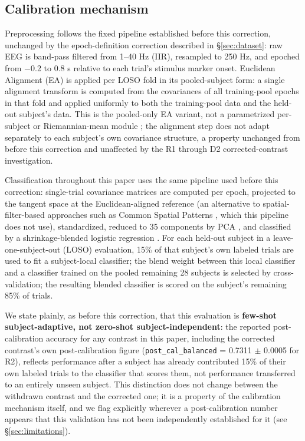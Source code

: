 \documentclass[preprint,12pt]{elsarticle}
\begin{document}
\subsection{Calibration mechanism}\label{sec:calibration}

Preprocessing follows the fixed pipeline established before this correction, unchanged by the epoch-definition correction described in \S\ref{sec:dataset}: raw EEG is band-pass filtered \cite{gramfort2013,delormemakeig2004,jas2017} from 1--40 Hz (IIR), resampled to 250 Hz, and epoched from $-$0.2 to 0.8 s relative to each trial's stimulus marker onset. Euclidean Alignment (EA) \cite{he2020} is applied per LOSO fold in its pooled-subject form: a single alignment transform is computed from the covariances of all training-pool epochs in that fold and applied uniformly to both the training-pool data and the held-out subject's data. This is the pooled-only EA variant, not a parametrized per-subject or Riemannian-mean module \cite{barachant2012,congedo2017,yger2017}; the alignment step does not adapt separately to each subject's own covariance structure, a property unchanged from before this correction and unaffected by the R1 through D2 corrected-contrast investigation.

Classification throughout this paper uses the same pipeline used before this correction: single-trial covariance matrices are computed per epoch, projected to the tangent space \cite{barachant2012,barachant2013} at the Euclidean-aligned reference (an alternative to spatial-filter-based approaches such as Common Spatial Patterns \cite{koles1991,ramoser2000,blankertz2008,lotteguan2011}, which this pipeline does not use), standardized, reduced to 35 components by PCA \cite{jolliffe2016}, and classified by a shrinkage-blended logistic regression \cite{ledoitwolf2004,friedman1989,blankertz2011}. For each held-out subject in a leave-one-subject-out (LOSO) evaluation, 15\% of that subject's own labeled trials are used to fit a subject-local classifier; the blend weight between this local classifier and a classifier trained on the pooled remaining 28 subjects is selected by cross-validation; the resulting blended classifier is scored on the subject's remaining 85\% of trials.

We state plainly, as before this correction, that this evaluation is \textbf{few-shot subject-adaptive, not zero-shot subject-independent}: the reported post-calibration accuracy for any contrast in this paper, including the corrected contrast's own post-calibration figure (\texttt{post\_cal\_balanced} = 0.7311 $\pm$ 0.0005 for R2), reflects performance after a subject has already contributed 15\% of their own labeled trials to the classifier that scores them, not performance transferred to an entirely unseen subject. This distinction does not change between the withdrawn contrast and the corrected one; it is a property of the calibration mechanism itself, and we flag explicitly wherever a post-calibration number appears that this validation has not been independently established for it (see \S\ref{sec:limitations}).
\end{document}
